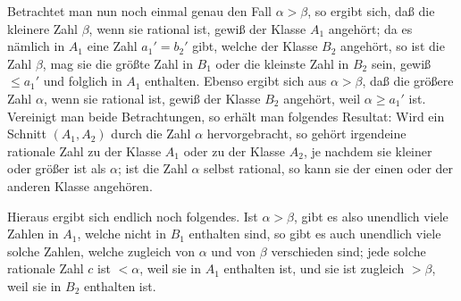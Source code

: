 \documentclass[11pt]{article}
\begin{document}
Betrachtet man nun noch einmal genau den Fall $\alpha>\beta$, so ergibt sich, daß die kleinere Zahl $\beta$, wenn sie rational ist, gewiß der Klasse $A_1$ angehört; da es nämlich in $A_1$ eine Zahl $a_1'=b_2'$ gibt, welche der Klasse $B_2$ angehört, so ist die Zahl $\beta$, mag sie die größte Zahl in $B_1$ oder die kleinste Zahl in $B_2$ sein, gewiß $\leq a_1'$ und folglich in $A_1$ enthalten. Ebenso ergibt sich aus $\alpha>\beta$, daß die größere Zahl $\alpha$, wenn sie rational ist, gewiß der Klasse $B_2$ angehört, weil $\alpha\geq a_1'$ ist. Vereinigt man beide Betrachtungen, so erhält man folgendes Resultat: Wird ein Schnitt $(A_1,A_2)$ durch die Zahl $\alpha$ hervorgebracht, so gehört irgendeine rationale Zahl zu der Klasse $A_1$ oder zu der Klasse $A_2$, je nachdem sie kleiner oder größer ist als $\alpha$; ist die Zahl $\alpha$ selbst rational, so kann sie der einen oder der anderen Klasse angehören.

Hieraus ergibt sich endlich noch folgendes. Ist $\alpha>\beta$, gibt es also unendlich viele Zahlen in $A_1$, welche nicht in $B_1$ enthalten sind, so gibt es auch unendlich viele solche Zahlen, welche zugleich von $\alpha$ und von $\beta$ verschieden sind; jede solche rationale Zahl $c$ ist $<\alpha$, weil sie in $A_1$ enthalten ist, und sie ist zugleich $>\beta$, weil sie in $B_2$ enthalten ist.
\end{document}

